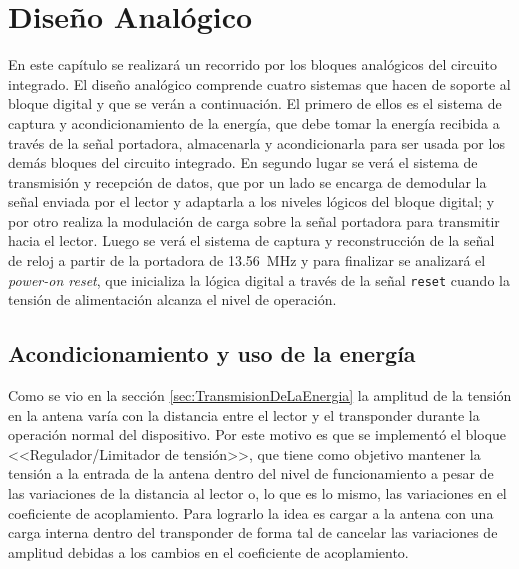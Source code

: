 \chapter{Diseño Analógico}

En este capítulo se realizará un recorrido por los bloques 
analógicos del circuito integrado. El diseño analógico comprende 
cuatro sistemas que hacen de soporte al bloque digital y que se 
verán a continuación. El primero de ellos es el sistema de captura y 
acondicionamiento de la energía, que debe tomar la energía recibida 
a través de la señal portadora, almacenarla y acondicionarla para 
ser usada por los demás bloques del circuito integrado. En segundo 
lugar se verá el sistema de transmisión y recepción de datos, que 
por un lado se encarga de demodular la señal enviada por el lector y 
adaptarla a los niveles lógicos del bloque digital; y por otro 
realiza la modulación de carga sobre la señal portadora para 
transmitir hacia el lector. Luego se verá el sistema de captura y 
reconstrucción de la señal de reloj a partir de la portadora de 
\SI{13.56}{\mega\hertz} y para finalizar se analizará el 
\emph{power-on reset}, que inicializa la lógica digital a través de la 
señal \lstinline{reset} cuando la tensión de alimentación alcanza el 
nivel de operación.


\section{Acondicionamiento y uso de la energía}

Como se vio en la sección \ref{sec:TransmisionDeLaEnergia} la amplitud 
de la tensión en la antena varía con la distancia entre el lector y 
el transponder durante la operación normal del dispositivo. Por este 
motivo es que se implementó el bloque <<Regulador/Limitador de 
tensión>>, que tiene como objetivo mantener la tensión a la entrada 
de la antena dentro del nivel de funcionamiento a pesar de las 
variaciones de la distancia al lector o, lo que es lo mismo, las 
variaciones en el coeficiente de acoplamiento. Para lograrlo la idea 
es cargar a la antena con una carga interna dentro del transponder 
de forma tal de cancelar las variaciones de amplitud 
debidas a los cambios en el coeficiente de acoplamiento. 

